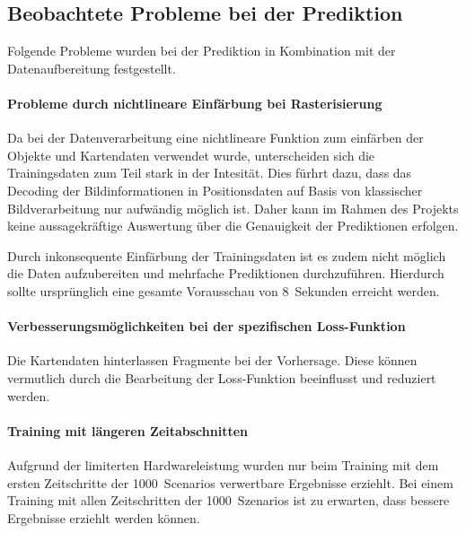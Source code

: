 \documentclass[12pt]{article}
\begin{document}
    \subsection{Beobachtete Probleme bei der Prediktion}
        Folgende Probleme wurden bei der Prediktion in Kombination mit der Datenaufbereitung festgestellt.
        
        \paragraph{Probleme durch nichtlineare Einfärbung bei Rasterisierung} Da bei der Datenverarbeitung eine 
        nichtlineare Funktion zum einfärben der Objekte und Kartendaten verwendet wurde, unterscheiden sich die Trainingsdaten 
        zum Teil stark in der Intesität. Dies fürhrt dazu, dass das Decoding der Bildinformationen in Positionsdaten auf 
        Basis von klassischer Bildverarbeitung nur aufwändig möglich ist. Daher kann im Rahmen des Projekts keine aussagekräftige 
        Auswertung über die Genauigkeit der Prediktionen erfolgen.

        Durch inkonsequente Einfärbung der Trainingsdaten ist es zudem nicht möglich die Daten aufzubereiten und mehrfache Prediktionen durchzuführen.
        Hierdurch sollte ursprünglich eine gesamte Vorausschau von 8~Sekunden erreicht werden.

        \paragraph{Verbesserungsmöglichkeiten bei der spezifischen Loss-Funktion} Die Kartendaten hinterlassen Fragmente bei der Vorhersage. 
        Diese können vermutlich durch die Bearbeitung der Loss-Funktion beeinflusst und reduziert werden.
        \paragraph{Training mit längeren Zeitabschnitten} Aufgrund der limiterten Hardwareleistung wurden nur beim Training mit dem ersten 
        Zeitschritte der 1000~Scenarios verwertbare Ergebnisse erziehlt. Bei einem Training mit allen Zeitschritten der 1000~Szenarios ist zu erwarten, 
        dass bessere Ergebnisse erziehlt werden können.
\end{document}
